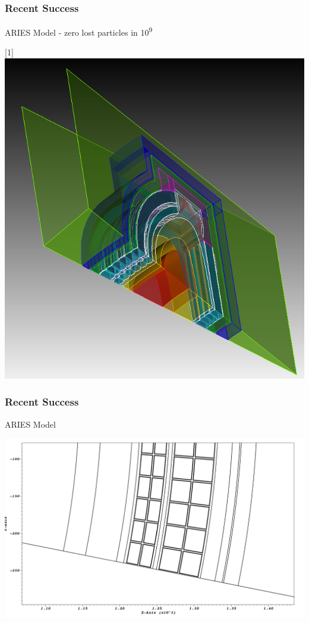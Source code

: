 \documentclass[14pt]{beamer}
\begin{document}
\begin{frame}
\frametitle{Recent Success}

ARIES Model - zero lost particles in 10\textsuperscript{9}
\begin{center}
\scalebox{-1}[1]{\includegraphics[scale=0.3]{sic-bottom.png}}
\end{center}

\end{frame}

\begin{frame}
\frametitle{Recent Success}
ARIES Model
\begin{center}
\includegraphics[scale=0.25]{Coolant_Channels.png}
\end{center}
\end{frame}
\end{document}
